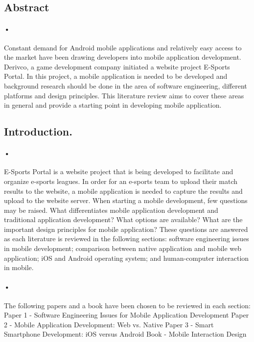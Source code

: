 \documentclass[7pt]{article}
\begin{document}
\subsection{Abstract}
\paragraph{•}
Constant demand for Android mobile applications and relatively easy access to the market have been drawing developers into mobile application development. Derivco, a game development company initiated a website project E-Sports Portal. In this project, a mobile application is needed to be developed  and background research should be done in the area of software engineering, different platforms and design principles. This literature review aims to cover these areas in general and provide a starting point in developing mobile application.

\subsection{Introduction.}
\paragraph{•}
E-Sports Portal is a website project that is being developed to facilitate and organize e-sports leagues. In order for an e-sports team to upload their match results to the website, a mobile application is needed to capture the results and upload to the website server. When starting a mobile development, few questions may be raised. What differentiates mobile application development and traditional application development? What options are available? What are the important design principles for mobile application? These questions are answered as each literature is reviewed in the following sections: software engineering issues in mobile development; comparison between native application and mobile web application; iOS and Android operating system; and human-computer interaction in mobile.
\paragraph{•}
The following papers and a book have been chosen to be reviewed in each section: Paper 1 - Software Engineering Issues for Mobile Application Development\cite{Wasserman} Paper 2 - Mobile Application Development: Web vs. Native\cite{Charland} Paper 3 - Smart Smartphone Development: iOS versus Android\cite{Goadrich} Book - Mobile Interaction Design\cite{Jones}
\end{document}
